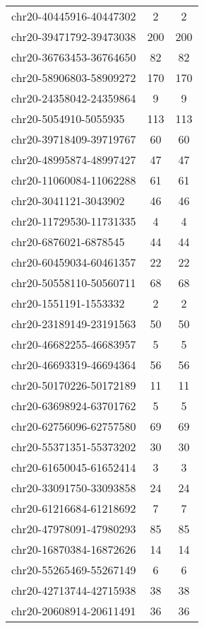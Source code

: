 \documentclass[10pt,letterpaper]{article}
\begin{document}
{\begin{longtable}{lSS}
	chr20-40445916-40447302 & 2      & 2        \\
	chr20-39471792-39473038 & 200    & 200      \\
	chr20-36763453-36764650 & 82     & 82       \\
	chr20-58906803-58909272 & 170    & 170      \\
	chr20-24358042-24359864 & 9      & 9        \\
	chr20-5054910-5055935   & 113    & 113      \\
	chr20-39718409-39719767 & 60     & 60       \\
	chr20-48995874-48997427 & 47     & 47       \\
	chr20-11060084-11062288 & 61     & 61       \\
	chr20-3041121-3043902   & 46     & 46       \\
	chr20-11729530-11731335 & 4      & 4        \\
	chr20-6876021-6878545   & 44     & 44       \\
	chr20-60459034-60461357 & 22     & 22       \\
	chr20-50558110-50560711 & 68     & 68       \\
	chr20-1551191-1553332   & 2      & 2        \\
	chr20-23189149-23191563 & 50     & 50       \\
	chr20-46682255-46683957 & 5      & 5        \\
	chr20-46693319-46694364 & 56     & 56       \\
	chr20-50170226-50172189 & 11     & 11       \\
	chr20-63698924-63701762 & 5      & 5        \\
	chr20-62756096-62757580 & 69     & 69       \\
	chr20-55371351-55373202 & 30     & 30       \\
	chr20-61650045-61652414 & 3      & 3        \\
	chr20-33091750-33093858 & 24     & 24       \\
	chr20-61216684-61218692 & 7      & 7        \\
	chr20-47978091-47980293 & 85     & 85       \\
	chr20-16870384-16872626 & 14     & 14       \\
	chr20-55265469-55267149 & 6      & 6        \\
	chr20-42713744-42715938 & 38     & 38       \\
	chr20-20608914-20611491 & 36     & 36       \\

\end{longtable}}
\end{document}
